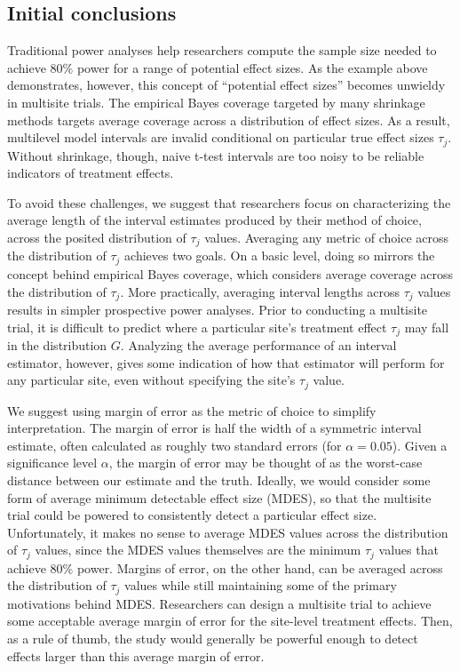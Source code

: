 \documentclass[]{article}
\begin{document}
\subsection{Initial conclusions}

Traditional power analyses help researchers compute the sample size needed to achieve 80\% power for a range of potential effect sizes.
As the example above demonstrates, however, this concept of ``potential effect sizes'' becomes unwieldy in multisite trials.
The empirical Bayes coverage targeted by many shrinkage methods targets average coverage across a distribution of effect sizes.
As a result, multilevel model intervals are invalid conditional on particular true effect sizes $\tau_j$.
Without shrinkage, though, naive t-test intervals are too noisy to be reliable indicators of treatment effects.

To avoid these challenges, we suggest that researchers focus on characterizing the average length of the interval estimates produced by their method of choice, across the posited distribution of $\tau_j$ values.
Averaging any metric of choice across the distribution of $\tau_j$ achieves two goals.
On a basic level, doing so mirrors the concept behind empirical Bayes coverage, which considers average coverage across the distribution of $\tau_j$.
More practically, averaging interval lengths across $\tau_j$ values results in simpler prospective power analyses.
Prior to conducting a multisite trial, it is difficult to predict where a particular site's treatment effect $\tau_j$ may fall in the distribution $G$.
Analyzing the average performance of an interval estimator, however, gives some indication of how that estimator will perform for any particular site, even without specifying the site's $\tau_j$ value.

We suggest using margin of error as the metric of choice to simplify interpretation.
The margin of error is half the width of a symmetric interval estimate, often calculated as roughly two standard errors (for $\alpha=0.05$).
Given a significance level $\alpha$, the margin of error may be thought of as the worst-case distance between our estimate and the truth.
Ideally, we would consider some form of average minimum detectable effect size (MDES), so that the multisite trial could be powered to consistently detect a particular effect size.
Unfortunately, it makes no sense to average MDES values across the distribution of $\tau_j$ values, since the MDES values themselves are the minimum $\tau_j$ values that achieve 80\% power.
Margins of error, on the other hand, can be averaged across the distribution of $\tau_j$ values while still maintaining some of the primary motivations behind MDES.
Researchers can design a multisite trial to achieve some acceptable average margin of error for the site-level treatment effects.
Then, as a rule of thumb, the study would generally be powerful enough to detect effects larger than this average margin of error.
\end{document}

